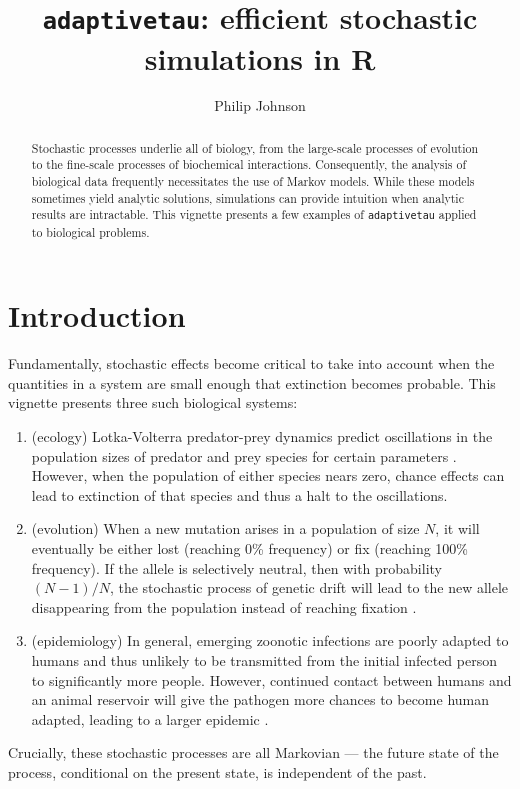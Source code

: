 \documentclass[11pt,nogin]{article}
\begin{document}
\title{\texttt{adaptivetau}: efficient stochastic simulations in R}
\author{Philip Johnson}
\date{}
\maketitle
\begin{abstract}
  Stochastic processes underlie all of biology, from the large-scale processes of evolution to the fine-scale processes of biochemical interactions. Consequently, the analysis of biological data frequently necessitates the use of Markov models.  While these models sometimes yield analytic solutions, simulations can provide intuition when analytic results are intractable.  This vignette presents a few examples of \texttt{adaptivetau} applied to biological problems.
\end{abstract}


\section*{Introduction}

Fundamentally, stochastic effects become critical to take into account when the quantities in a system are small enough that extinction becomes probable.  This vignette presents three such biological systems:
\begin{enumerate}
  \item (ecology) Lotka-Volterra predator-prey dynamics predict oscillations in the population sizes of predator and prey species for certain parameters \citep{Lot20}.  However, when the population of either species nears zero, chance effects can lead to extinction of that species and thus a halt to the oscillations.
  \item (evolution) When a new mutation arises in a population of size $N$, it will eventually be either lost (reaching 0\% frequency) or fix (reaching 100\% frequency).   If the allele is selectively neutral, then with probability $(N-1)/N$, the stochastic process of genetic drift will lead to the new allele disappearing from the population instead of reaching fixation \citep{Kim57}.
  \item (epidemiology) In general, emerging zoonotic infections are poorly adapted to humans and thus unlikely to be transmitted from the initial infected person to significantly more people.  However, continued contact between humans and an animal reservoir will give the pathogen more chances to become human adapted, leading to a larger epidemic \citep{LGP+09}.
\end{enumerate}
Crucially, these stochastic processes are all Markovian --- the future state of the process, conditional on the present state, is independent of the past.
\end{document}
